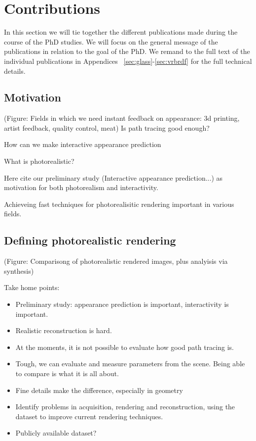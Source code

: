 \chapter{Contributions}

In this section we will tie together the different publications made during the course of the PhD studies. We will focus on the general message of the publications in relation to the goal of the PhD. We remand to the full text of the individual publications in Appendices~ \ref{sec:glass}-\ref{sec:vrbrdf} for the full technical details.

\section{Motivation}
(Figure: Fields in which we need instant feedback on appearance: 3d printing, artist feedback, quality control, meat)
Is path tracing good enough?

How can we make interactive appearance prediction

What is photorealistic?

Here cite our preliminary study (Interactive appearance prediction...) as motivation for both photorealism and interactivity.

Achieveing fast techniques for photorealisitic rendering important in various fields.


\section{Defining photorealistic rendering}
(Figure: Comparisong of photorealistic rendered images, plus analyisis via synthesis)

Take home points:
\begin{itemize}
\item Preliminary study: appearance prediction is important, interactivity is important.
\item Realistic reconstruction is hard. 
\item At the moments, it is not possible to evaluate how good path tracing is.
\item Tough, we can evaluate and measure parameters from the scene. Being able to compare is what it is all about.
\item Fine details make the difference, especially in geometry
\item Identify problems in acquisition, rendering and reconstruction, using the dataset to improve current rendering techniques.
\item Publicly available dataset?

\end{itemize}

